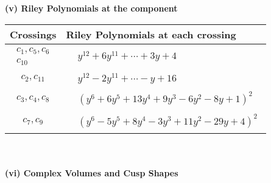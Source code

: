 \documentclass[1p]{elsarticle_modified}
\theoremstyle{definition}
\begin{document}
\newpage\renewcommand{\arraystretch}{1}
\flushleft \textbf{(v) Riley Polynomials at the component}\newline \\
\begin{tabular}{m{50pt}|m{274pt}}
Crossings & \hspace{64pt}Riley Polynomials at each crossing \\
\hline $$\begin{aligned}c_{1},c_{5},c_{6}\\c_{10}\end{aligned}$$&$\begin{aligned}
&y^{12}+6 y^{11}+\cdots+3 y+4
\end{aligned}$\\
\hline $$\begin{aligned}c_{2},c_{11}\end{aligned}$$&$\begin{aligned}
&y^{12}-2 y^{11}+\cdots- y+16
\end{aligned}$\\
\hline $$\begin{aligned}c_{3},c_{4},c_{8}\end{aligned}$$&$\begin{aligned}
&(y^6+6 y^5+13 y^4+9 y^3-6 y^2-8 y+1)^2
\end{aligned}$\\
\hline $$\begin{aligned}c_{7},c_{9}\end{aligned}$$&$\begin{aligned}
&(y^6-5 y^5+8 y^4-3 y^3+11 y^2-29 y+4)^2
\end{aligned}$\\
\hline
\end{tabular}\\~\\
\newpage\flushleft \textbf{(vi) Complex Volumes and Cusp Shapes}
\end{document}
